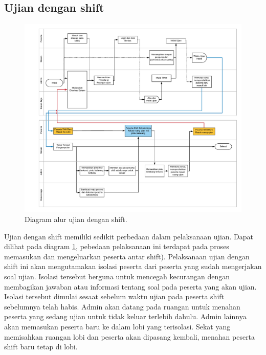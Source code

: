     \subsection{Ujian dengan shift}
        \begin{figure}
            \centering
            \includegraphics[height=0.8\paperwidth]{Gambar/flowchart/exam-flow-ujian-shift.pdf}
            \caption{Diagram alur ujian dengan shift.}
            \label{fig:flowchart-exam-exam-with-shift}
        \end{figure}
        Ujian dengan shift memiliki sedikit perbedaan dalam pelaksanaan ujian.
        Dapat dilihat pada diagram \ref{fig:flowchart-exam-exam-with-shift},
        pebedaan pelaksanaan ini terdapat pada proses memasukan dan mengeluarkan
        peserta antar shift). Pelaksanaan ujian dengan shift ini akan
        mengutamakan isolasi peserta dari peserta yang sudah mengerjakan soal
        ujian. Isolasi tersebut berguna untuk mencegah kecurangan dengan
        membagikan jawaban atau informasi tentang soal pada peserta yang akan
        ujian. Isolasi tersebut dimulai sesaat sebelum waktu ujian pada peserta
        shift sebelumnya telah habis. Admin akan datang pada ruangan untuk
        menahan peserta yang sedang ujian untuk tidak keluar terlebih dahulu.
        Admin lainnya akan memasukan peserta baru ke dalam lobi yang terisolasi.
        Sekat yang memisahkan ruangan lobi dan peserta akan dipasang kembali,
        menahan peserta shift baru tetap di lobi.
        
